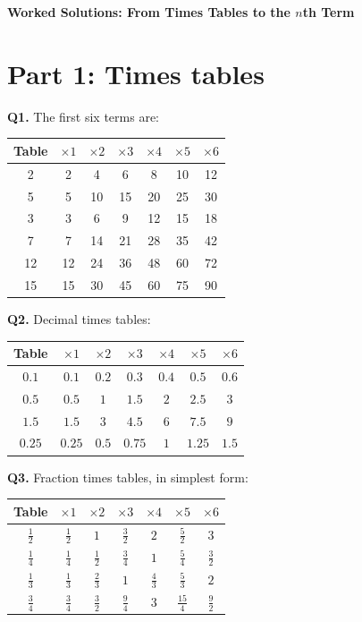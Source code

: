 \documentclass[11pt,a4paper]{article}
\begin{document}
\begin{center}
{\Large\bfseries Worked Solutions: From Times Tables to the $n$th Term}
\end{center}

\section*{Part 1: Times tables}

\textbf{Q1.} The first six terms are:
\begin{center}\small
\begin{tabular}{|c|*{6}{c|}}\hline
Table & \(\times1\) & \(\times2\) & \(\times3\) & \(\times4\) & \(\times5\) & \(\times6\)\\\hline
2 & 2 & 4 & 6 & 8 & 10 & 12\\
5 & 5 & 10 & 15 & 20 & 25 & 30\\
3 & 3 & 6 & 9 & 12 & 15 & 18\\
7 & 7 & 14 & 21 & 28 & 35 & 42\\
12 & 12 & 24 & 36 & 48 & 60 & 72\\
15 & 15 & 30 & 45 & 60 & 75 & 90\\\hline
\end{tabular}
\end{center}

\textbf{Q2.} Decimal times tables:
\begin{center}\small
\begin{tabular}{|c|*{6}{c|}}\hline
Table & \(\times1\) & \(\times2\) & \(\times3\) & \(\times4\) & \(\times5\) & \(\times6\)\\\hline
\(0.1\) & \(0.1\) & \(0.2\) & \(0.3\) & \(0.4\) & \(0.5\) & \(0.6\)\\
\(0.5\) & \(0.5\) & \(1\) & \(1.5\) & \(2\) & \(2.5\) & \(3\)\\
\(1.5\) & \(1.5\) & \(3\) & \(4.5\) & \(6\) & \(7.5\) & \(9\)\\
\(0.25\) & \(0.25\) & \(0.5\) & \(0.75\) & \(1\) & \(1.25\) & \(1.5\)\\\hline
\end{tabular}
\end{center}

\textbf{Q3.} Fraction times tables, in simplest form:
\begin{center}\small
\begin{tabular}{|c|*{6}{c|}}\hline
Table & \(\times1\) & \(\times2\) & \(\times3\) & \(\times4\) & \(\times5\) & \(\times6\)\\\hline
\(\frac12\) & \(\frac12\) & \(1\) & \(\frac32\) & \(2\) & \(\frac52\) & \(3\)\\
\(\frac14\) & \(\frac14\) & \(\frac12\) & \(\frac34\) & \(1\) & \(\frac54\) & \(\frac32\)\\
\(\frac13\) & \(\frac13\) & \(\frac23\) & \(1\) & \(\frac43\) & \(\frac53\) & \(2\)\\
\(\frac34\) & \(\frac34\) & \(\frac32\) & \(\frac94\) & \(3\) & \(\frac{15}{4}\) & \(\frac92\)\\\hline
\end{tabular}
\end{center}
\end{document}
